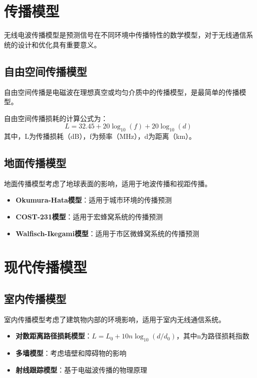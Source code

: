 \documentclass[12pt,UTF8]{ctexbook}
\begin{document}
\section{传播模型}

无线电波传播模型是预测信号在不同环境中传播特性的数学模型，对于无线通信系统的设计和优化具有重要意义。

\subsection{自由空间传播模型}
自由空间传播是电磁波在理想真空或均匀介质中的传播模型，是最简单的传播模型。

自由空间传播损耗的计算公式为：
\begin{equation}
L = 32.45 + 20\log_{10}(f) + 20\log_{10}(d)
\end{equation}
其中，L为传播损耗（dB），f为频率（MHz），d为距离（km）。

\subsection{地面传播模型}
地面传播模型考虑了地球表面的影响，适用于地波传播和视距传播。
\begin{itemize}[leftmargin=3.5em]
    \item \textbf{Okumura-Hata模型}：适用于城市环境的传播预测
    \item \textbf{COST-231模型}：适用于宏蜂窝系统的传播预测
    \item \textbf{Walfisch-Ikegami模型}：适用于市区微蜂窝系统的传播预测
\end{itemize}

\section{现代传播模型}

\subsection{室内传播模型}
室内传播模型考虑了建筑物内部的环境影响，适用于室内无线通信系统。
\begin{itemize}[leftmargin=3.5em]
    \item \textbf{对数距离路径损耗模型}：$L = L_0 + 10n\log_{10}(d/d_0)$，其中n为路径损耗指数
    \item \textbf{多墙模型}：考虑墙壁和障碍物的影响
    \item \textbf{射线跟踪模型}：基于电磁波传播的物理原理
\end{itemize}
\end{document}
